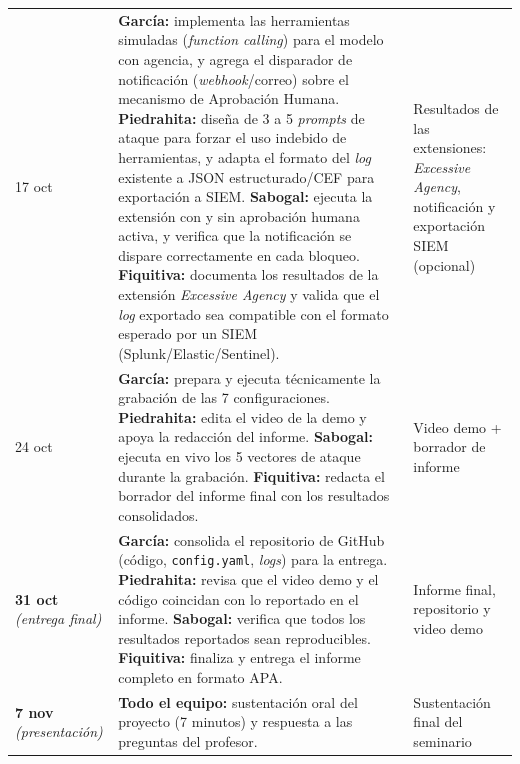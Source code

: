 \documentclass[11pt,letterpaper]{article}
\begin{document}
\begin{center}
\begin{longtable}{@{}p{1.9cm}p{9.9cm}p{2.9cm}@{}}
17 oct &
\textbf{García:} implementa las herramientas simuladas (\emph{function calling}) para el modelo con agencia, y agrega el disparador de notificación (\emph{webhook}/correo) sobre el mecanismo de Aprobación Humana.\newline
\textbf{Piedrahita:} diseña de 3 a 5 \emph{prompts} de ataque para forzar el uso indebido de herramientas, y adapta el formato del \emph{log} existente a JSON estructurado/CEF para exportación a SIEM.\newline
\textbf{Sabogal:} ejecuta la extensión con y sin aprobación humana activa, y verifica que la notificación se dispare correctamente en cada bloqueo.\newline
\textbf{Fiquitiva:} documenta los resultados de la extensión \emph{Excessive Agency} y valida que el \emph{log} exportado sea compatible con el formato esperado por un SIEM (Splunk/Elastic/Sentinel). &
Resultados de las extensiones: \emph{Excessive Agency}, notificación y exportación SIEM (opcional) \\[4pt]

24 oct &
\textbf{García:} prepara y ejecuta técnicamente la grabación de las 7 configuraciones.\newline
\textbf{Piedrahita:} edita el video de la demo y apoya la redacción del informe.\newline
\textbf{Sabogal:} ejecuta en vivo los 5 vectores de ataque durante la grabación.\newline
\textbf{Fiquitiva:} redacta el borrador del informe final con los resultados consolidados. &
Video demo + borrador de informe \\[4pt]

\textbf{31 oct} \emph{(entrega final)} &
\textbf{García:} consolida el repositorio de GitHub (código, \texttt{config.yaml}, \emph{logs}) para la entrega.\newline
\textbf{Piedrahita:} revisa que el video demo y el código coincidan con lo reportado en el informe.\newline
\textbf{Sabogal:} verifica que todos los resultados reportados sean reproducibles.\newline
\textbf{Fiquitiva:} finaliza y entrega el informe completo en formato APA. &
Informe final, repositorio y video demo \\[4pt]

\textbf{7 nov} \emph{(presentación)} &
\textbf{Todo el equipo:} sustentación oral del proyecto (7 minutos) y respuesta a las preguntas del profesor. &
Sustentación final del seminario \\

\end{longtable}
\end{center}
\end{document}
